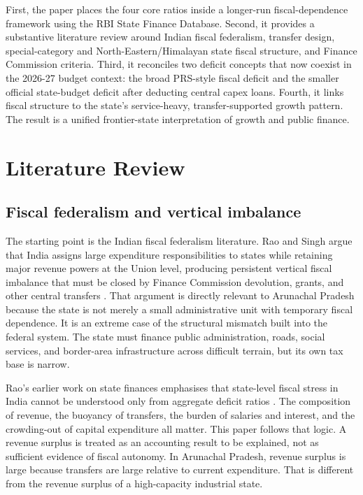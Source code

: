 \documentclass[11pt,a4paper]{article}
\begin{document}
First, the paper places the four core ratios inside a longer-run fiscal-dependence framework using the RBI State Finance Database. Second, it provides a substantive literature review around Indian fiscal federalism, transfer design, special-category and North-Eastern/Himalayan state fiscal structure, and Finance Commission criteria. Third, it reconciles two deficit concepts that now coexist in the 2026-27 budget context: the broad PRS-style fiscal deficit and the smaller official state-budget deficit after deducting central capex loans. Fourth, it links fiscal structure to the state's service-heavy, transfer-supported growth pattern. The result is a unified frontier-state interpretation of growth and public finance.

\section{Literature Review}

\subsection{Fiscal federalism and vertical imbalance}

The starting point is the Indian fiscal federalism literature. Rao and Singh argue that India assigns large expenditure responsibilities to states while retaining major revenue powers at the Union level, producing persistent vertical fiscal imbalance that must be closed by Finance Commission devolution, grants, and other central transfers \cite{rao_singh_2005}. That argument is directly relevant to Arunachal Pradesh because the state is not merely a small administrative unit with temporary fiscal dependence. It is an extreme case of the structural mismatch built into the federal system. The state must finance public administration, roads, social services, and border-area infrastructure across difficult terrain, but its own tax base is narrow.

Rao's earlier work on state finances emphasises that state-level fiscal stress in India cannot be understood only from aggregate deficit ratios \cite{rao_2002}. The composition of revenue, the buoyancy of transfers, the burden of salaries and interest, and the crowding-out of capital expenditure all matter. This paper follows that logic. A revenue surplus is treated as an accounting result to be explained, not as sufficient evidence of fiscal autonomy. In Arunachal Pradesh, revenue surplus is large because transfers are large relative to current expenditure. That is different from the revenue surplus of a high-capacity industrial state.
\end{document}

